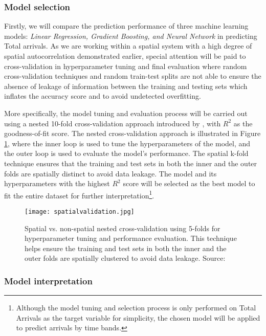\subsubsection*{Model selection}
Firstly, we will compare the prediction performance of three machine learning models: \textit{Linear Regression, Gradient Boosting, and Neural Network} in predicting Total arrivals. As we are working within a spatial system with a high degree of spatial autocorrelation demonstrated earlier, special attention will be paid to cross-validation in hyperparameter tuning and final evaluation where random cross-validation techniques and random train-test splits are not able to ensure the absence of leakage of information between the training and testing sets which inflates the accuracy score and to avoid undetected overfitting. 

More specifically, the model tuning and evaluation process will be carried out using a nested 10-fold cross-validation approach introduced by \citet{schratzPerformanceEvaluationHyperparameter2018}, with $R^2$ as the goodness-of-fit score. The nested cross-validation approach is illustrated in Figure \ref{fig:spatialnested}, where the inner loop is used to tune the hyperparameters of the model, and the outer loop is used to evaluate the model's performance. The spatial k-fold technique ensures that the training and test sets in both the inner and the outer folds are spatially distinct to avoid data leakage. The model and its hyperparameters with the highest $R^2$ score will be selected as the best model to fit the entire dataset for further interpretation\footnote{Although the model tuning and selection process is only performed on Total Arrivals as the target variable for simplicity, the chosen model will be applied to predict arrivals by time bands.}.

\begin{figure}[!ht]
    \centering
    \texttt{[image: spatialvalidation.jpg]}
    \captionsetup{justification=centering}
    \caption{Spatial vs. non-spatial nested cross-validation using 5-folds for hyperparameter tuning and performance evaluation. This technique helps ensure the training and test sets in both the inner and the outer folds are spatially clustered to avoid data leakage. Source: \citet{schratzPerformanceEvaluationHyperparameter2018}}
    \label{fig:spatialnested}
\end{figure}

\subsubsection*{Model interpretation}

